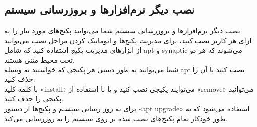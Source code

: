 \subsection{نصب دیگر نرم‌افزارها و بروزرسانی سیستم}
\begin{frame}{نصب دیگر نرم‌افزارها و بروزرسانی سیستم}
  شما می‌توایند پکیج‌های مورد نیاز را به ازای هر کاربر نصب کنید، برای مدیریت پکیج‌ها و اتوماتیک کردن مراحل نصب می‌توانید از ابزارهای مدیریت پکیج استفاده کنید که شامل apt و synaptic می‌شوند که هر دو تحت محیط متنی هستند.\\
  شما می‌توانید به طور دستی هر پکیجی که خواستید به وسیله apt نصب کنید یا آن را حذف کنید.\\
  با کلمه کلید «install» می‌توایند پکیجی نصب کنید و یا با استفاده از «remove» می‌توانید پکیجی را حذف کنید.\\

  برای به روز رسانی سیستم و پکیج‌ها از دستور «apt upgrade» استفاده می‌شود که به طور خودکار تمام پکیج‌های نصب شده بر روی سیستم را به روزرسانی می‌کند.
\end{frame}


